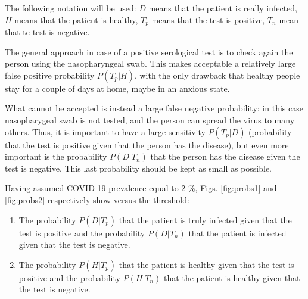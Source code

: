 \documentclass[12pt]{article}
\begin{document}
The following notation will be used: $D$ means that the patient is really infected, $H$ means that the patient is healthy, $T_p$ means that the test is positive, $T_n$ mean that te test is negative.

The general approach in case of a positive serological test is to check again the person using the nasopharyngeal swab. This makes acceptable a  relatively large false positive probability $P(T_p|H)$, with the only drawback that healthy people stay for a couple of days at home, maybe in an anxious state. 

What cannot be accepted is instead a large false negative probability: in this case nasopharygeal swab is not tested, and the person can spread the virus to many others. Thus, it is important to have a large sensitivity $P(T_p|D)$ (probability that the test is positive given that the person has the disease), but even more important is the probability $P(D|T_n)$ that the person has the disease given the test is negative. This last probability should be kept as small as possible. 

Having assumed COVID-19 prevalence equal to 2 \%, Figs. \ref{fig:probs1} and \ref{fig:probs2} respectively show versus the threshold: 
\begin{enumerate}
    \item The probability $P(D|T_p)$ that the patient is truly infected given that the test is positive and the probability $P(D|T_n)$ that the patient is infected given that the test is negative.
    \item The probability $P(H|T_p)$ that the patient is healthy given that the test is positive and the probability $P(H|T_n)$ that the patient is healthy given that the test is negative.
\end{enumerate}
\end{document}
